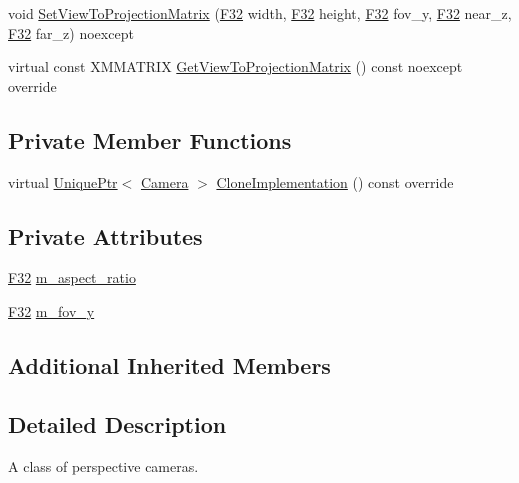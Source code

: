 \begin{DoxyCompactItemize}
\item 
void \hyperlink{classmage_1_1_perspective_camera_af118d8e1dd3fffa79a20b6201fb7cb9d}{Set\+View\+To\+Projection\+Matrix} (\hyperlink{namespacemage_aa97e833b45f06d60a0a9c4fc22ae02c0}{F32} width, \hyperlink{namespacemage_aa97e833b45f06d60a0a9c4fc22ae02c0}{F32} height, \hyperlink{namespacemage_aa97e833b45f06d60a0a9c4fc22ae02c0}{F32} fov\+\_\+y, \hyperlink{namespacemage_aa97e833b45f06d60a0a9c4fc22ae02c0}{F32} near\+\_\+z, \hyperlink{namespacemage_aa97e833b45f06d60a0a9c4fc22ae02c0}{F32} far\+\_\+z) noexcept
\item 
virtual const X\+M\+M\+A\+T\+R\+IX \hyperlink{classmage_1_1_perspective_camera_a5b733ac978a22dc58b04cf301899d575}{Get\+View\+To\+Projection\+Matrix} () const noexcept override
\end{DoxyCompactItemize}
\subsection*{Private Member Functions}
\begin{DoxyCompactItemize}
\item 
virtual \hyperlink{namespacemage_a3316d7143a973e37adf1110f2e80ca31}{Unique\+Ptr}$<$ \hyperlink{classmage_1_1_camera}{Camera} $>$ \hyperlink{classmage_1_1_perspective_camera_aa597ab884256b7e6fad63653af3ac789}{Clone\+Implementation} () const override
\end{DoxyCompactItemize}
\subsection*{Private Attributes}
\begin{DoxyCompactItemize}
\item 
\hyperlink{namespacemage_aa97e833b45f06d60a0a9c4fc22ae02c0}{F32} \hyperlink{classmage_1_1_perspective_camera_a9fd1ed697013ed616a616e32dcd009ca}{m\+\_\+aspect\+\_\+ratio}
\item 
\hyperlink{namespacemage_aa97e833b45f06d60a0a9c4fc22ae02c0}{F32} \hyperlink{classmage_1_1_perspective_camera_aa55ec2c2f069dcdd8bfd0554a2f5011d}{m\+\_\+fov\+\_\+y}
\end{DoxyCompactItemize}
\subsection*{Additional Inherited Members}


\subsection{Detailed Description}
A class of perspective cameras. 

